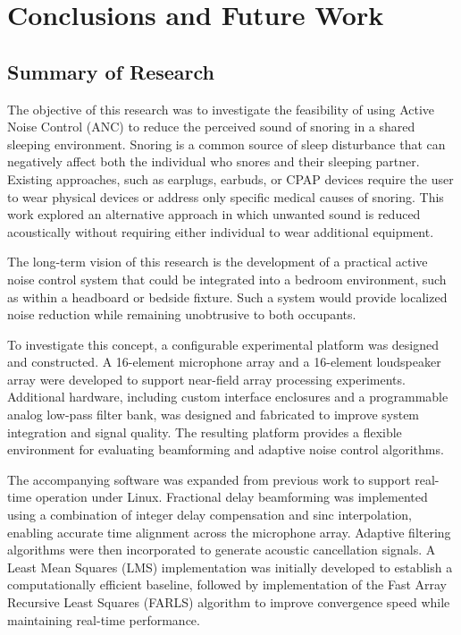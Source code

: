%
%
%
%

\chapter{Conclusions and Future Work}

\section{Summary of Research}

The objective of this research was to investigate the feasibility of using Active Noise Control (ANC) to reduce the perceived sound of snoring in a shared sleeping environment. Snoring is a common source of sleep disturbance that can negatively affect both the individual who snores and their sleeping partner. Existing approaches, such as earplugs, earbuds, or CPAP devices require the user to wear physical devices or address only specific medical causes of snoring. This work explored an alternative approach in which unwanted sound is reduced acoustically without requiring either individual to wear additional equipment.

The long-term vision of this research is the development of a practical active noise control system that could be integrated into a bedroom environment, such as within a headboard or bedside fixture. Such a system would provide localized noise reduction while remaining unobtrusive to both occupants.

To investigate this concept, a configurable experimental platform was designed and constructed. A 16-element microphone array and a 16-element loudspeaker array were developed to support near-field array processing experiments. Additional hardware, including custom interface enclosures and a programmable analog low-pass filter bank, was designed and fabricated to improve system integration and signal quality. The resulting platform provides a flexible environment for evaluating beamforming and adaptive noise control algorithms.

The accompanying software was expanded from previous work to support real-time operation under Linux. Fractional delay beamforming was implemented using a combination of integer delay compensation and sinc interpolation, enabling accurate time alignment across the microphone array. Adaptive filtering algorithms were then incorporated to generate acoustic cancellation signals. A Least Mean Squares (LMS) implementation was initially developed to establish a computationally efficient baseline, followed by implementation of the Fast Array Recursive Least Squares (FARLS) algorithm to improve convergence speed while maintaining real-time performance.

